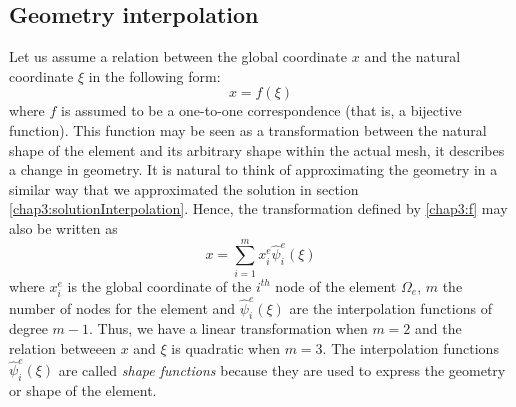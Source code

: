 	\subsection{Geometry interpolation}
Let us assume a relation between the global coordinate $ x $ and the natural coordinate $ \xi $ in the following form:
\begin{equation}
\label{chap3:f}
x = f(\xi)
\end{equation}
where $ f $ is assumed to be a one-to-one correspondence (that is, a bijective function). This function may be seen as a transformation between the natural shape of the element and its arbitrary shape within the actual mesh, it describes a change in geometry. It is natural to think of approximating the geometry in a similar way that we approximated the solution in section \ref{chap3:solutionInterpolation}. Hence, the transformation defined by \eqref{chap3:f} may also be written as
\begin{equation}
\label{chap3:shapeFunctions}
x = \sum_{i=1}^m x_i^e \hat{\psi}_i^e(\xi)
\end{equation}
where $ x_i^e $ is the global coordinate of the $ i^{th} $ node of the element $ \Omega_e $, $ m $ the number of nodes for the element and $ \hat{\psi}_i^e(\xi) $ are the interpolation functions of degree $ m-1 $. Thus, we have a linear transformation when $ m = 2 $ and the relation betweeen $ x $ and $ \xi $ is quadratic when $ m=3 $. The interpolation functions $ \hat{\psi}_i^e(\xi) $ are called \emph{shape functions} because they are used to express the geometry or shape of the element. 

\bigskip

